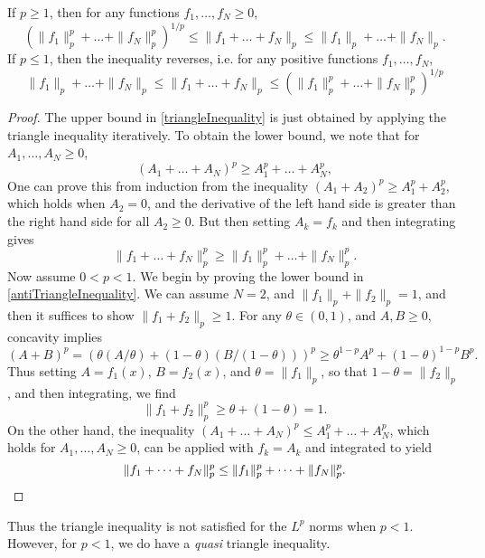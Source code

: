 \begin{theorem}
    If $p \geq 1$, then for any functions $f_1, \dots, f_N \geq 0$,
    \begin{equation} \label{triangleInequality} ( \| f_1 \|_p^p + \dots + \| f_N \|_p^p )^{1/p} \leq \| f_1 + \dots + f_N \|_p \leq \| f_1 \|_p + \dots + \| f_N \|_p. \end{equation}
    If $p \leq 1$, then the inequality reverses, i.e. for any positive functions $f_1, \dots, f_N$,
    \begin{equation} \label{antiTriangleInequality} \| f_1 \|_p + \dots + \| f_N \|_p \leq \| f_1 + \dots + f_N \|_p \leq (\| f_1 \|_p^p + \dots + \| f_N \|_p^p)^{1/p} \end{equation}
\end{theorem}
\begin{proof}
    The upper bound in \eqref{triangleInequality} is just obtained by applying the triangle inequality iteratively. To obtain the lower bound, we note that for $A_1, \dots, A_N \geq 0$,
    \[ (A_1 + \dots + A_N)^p \geq A_1^p + \dots + A_N^p, \]
    One can prove this from induction from the inequality $(A_1 + A_2)^p \geq A_1^p + A_2^p$, which holds when $A_2 = 0$, and the derivative of the left hand side is greater than the right hand side for all $A_2 \geq 0$. But then setting $A_k = f_k$ and then integrating gives
    \[ \| f_1 + \dots + f_N \|_p^p \geq \| f_1 \|_p^p + \dots + \| f_N \|_p^p. \]
    Now assume $0 < p < 1$. We begin by proving the lower bound in \ref{antiTriangleInequality}. We can assume $N = 2$, and $\| f_1 \|_p + \| f_2 \|_p = 1$, and then it suffices to show $\| f_1 + f_2 \|_p \geq 1$. For any $\theta \in (0,1)$, and $A,B \geq 0$, concavity implies
    \[ (A + B)^p = (\theta (A/\theta) + (1 - \theta) (B/(1-\theta)))^p \geq \theta^{1-p} A^p + (1 - \theta)^{1-p} B^p. \]
    Thus setting $A = f_1(x)$, $B = f_2(x)$, and $\theta = \| f_1 \|_p$, so that $1 - \theta = \| f_2 \|_p$, and then integrating, we find
    \[ \| f_1 + f_2 \|_p^p \geq \theta + (1 - \theta) = 1. \]
    On the other hand, the inequality $(A_1 + \dots + A_N)^p \leq A_1^p + \dots + A_N^p$, which holds for $A_1, \dots, A_N \geq 0$, can be applied with $f_k = A_k$ and integrated to yield
    \[ \| f_1 + \dots + f_N \|_p^p \leq \| f_1 \|_p^p + \dots + \| f_N \|_p^p. \qedhere \]
\end{proof}

Thus the triangle inequality is not satisfied for the $L^p$ norms when $p < 1$. However, for $p < 1$, we do have a \emph{quasi} triangle inequality.

